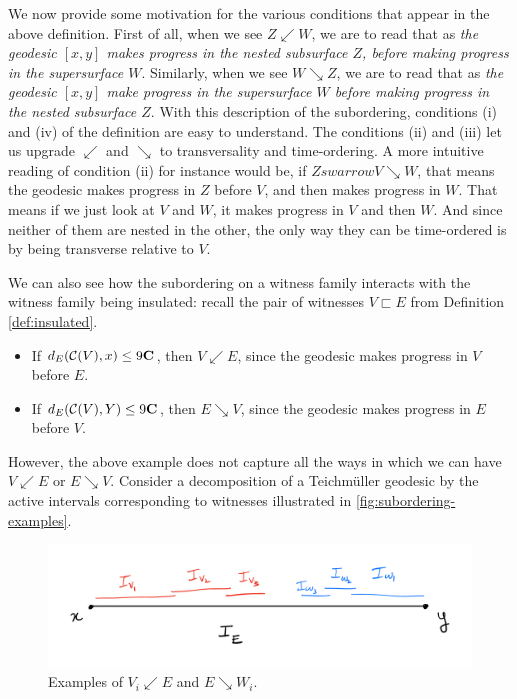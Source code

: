 \documentclass[12pt, reqno]{amsart}
\begin{document}
  We now provide some motivation for the various conditions that appear in the above definition.
  First of all, when we see $Z \swarrow W$, we are to read that as \emph{the geodesic $[x,y]$ makes progress in the nested subsurface $Z$, before making progress in the supersurface $W$}.
  Similarly, when we see $W \searrow Z$, we are to read that as \emph{the geodesic $[x,y]$ make progress in the supersurface $W$ before making progress in the nested subsurface $Z$}.
  With this description of the subordering, conditions (i) and (iv) of the definition are easy to understand. The conditions (ii) and (iii) let us upgrade $\swarrow$ and $\searrow$ to transversality and time-ordering.
  A more intuitive reading of condition (ii) for instance would be, if $Z swarrow V \searrow W$, that means the geodesic makes progress in $Z$ before $V$, and then makes progress in $W$.
  That means if we just look at $V$ and $W$, it makes progress in $V$ and then $W$. And since neither of them are nested in the other, the only way they can be time-ordered is by being transverse relative to $V$.

  We can also see how the subordering on a witness family interacts with the witness family being insulated: recall the pair of witnesses $V \sqsubset E$ from Definition \ref{def:insulated}.
  \begin{itemize}
  \item If $d_E(\mathcal{C}(V), x) \leq 9 \mathbf{C}$, then $V \swarrow E$, since the geodesic makes progress in $V$ before $E$.
  \item If $d_E(\mathcal{C}(V), Y) \leq 9 \mathbf{C}$, then $E \searrow V$, since the geodesic makes progress in $E$ before $V$.
  \end{itemize}
  However, the above example does not capture all the ways in which we can have $V \swarrow E$ or $E \searrow V$.
  Consider a decomposition of a Teichmüller geodesic by the active intervals corresponding to witnesses illustrated in \autoref{fig:subordering-examples}.
  \begin{figure}[h]
    \centering
    \includegraphics[scale=0.5]{images/subordering-example.png}
    \caption{Examples of $V_i \swarrow E$ and $E \searrow W_i$.}
    \label{fig:subordering-examples}
  \end{figure}
\end{document}
